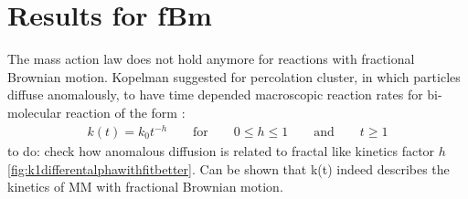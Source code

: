 \documentclass[
  a4paper,BCOR10mm,oneside,
  headsepline,footsepline,%
  fleqn,openbib
]{scrbook}
\begin{document}

\section{Results for fBm}
The mass action law does not hold anymore for reactions with fractional Brownian motion. Kopelman suggested for percolation cluster, in which particles diffuse   anomalously, to have time depended macroscopic reaction rates for bi-molecular reaction of the form \cite{Kopelman1988}:
\begin{align} \label{ktime}
k(t)=k_0 t^{-h} \qquad \text{for} \qquad 0 \leq h \leq 1 \qquad \text{and} \qquad t \geq 1
\end{align}
to do: check how anomalous diffusion is related to fractal like kinetics factor $h$ \cref{fig:k1differentalphawithfitbetter}. Can be shown that k(t) indeed describes the kinetics of MM with fractional Brownian motion. 
\end{document}

